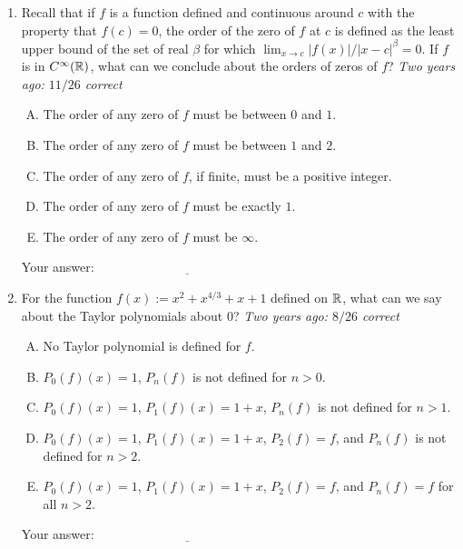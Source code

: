 \documentclass[10pt]{amsart}
\begin{document}
\begin{enumerate}

\item Recall that if $f$ is a function defined and continuous around
  $c$ with the property that $f(c) = 0$, the order of the zero of $f$
  at $c$ is defined as the least upper bound of the set of real $\beta$ for
  which $\lim_{x \to c} |f(x)|/|x - c|^\beta = 0$. If $f$ is in
  $C^{\infty}(\mathbb{R})$, what can we conclude about the orders of zeros of
  $f$? {\em Two years ago: $11/26$ correct}

  \begin{enumerate}[(A)]
  \item The order of any zero of $f$ must be between $0$ and $1$.
  \item The order of any zero of $f$ must be between $1$ and $2$.
  \item The order of any zero of $f$, if finite, must be a positive
  integer.
  \item The order of any zero of $f$ must be exactly $1$.
  \item The order of any zero of $f$ must be $\infty$.
  \end{enumerate}

  \vspace{0.05in}
  Your answer: $\underline{\qquad\qquad\qquad\qquad\qquad\qquad\qquad}$
  \vspace{0.05in}

\item For the function $f(x) := x^2 + x^{4/3} + x + 1$ defined on
  $\mathbb{R}$, what can we say about the Taylor polynomials about $0$? {\em
  Two years ago: $8/26$ correct}

  \begin{enumerate}[(A)]
  \item No Taylor polynomial is defined for $f$.
  \item $P_0(f)(x) = 1$, $P_n(f)$ is not defined for $n > 0$.
  \item $P_0(f)(x) = 1$, $P_1(f)(x) = 1 + x$, $P_n(f)$ is not defined
    for $n > 1$.
  \item $P_0(f)(x) = 1$, $P_1(f)(x) = 1 + x$, $P_2(f) = f$, and
    $P_n(f)$ is not defined for $n > 2$.
  \item $P_0(f)(x) = 1$, $P_1(f)(x) = 1 + x$, $P_2(f) = f$, and
    $P_n(f) = f$ for all $n > 2$.
  \end{enumerate}

  \vspace{0.05in}
  Your answer: $\underline{\qquad\qquad\qquad\qquad\qquad\qquad\qquad}$
  \vspace{0.05in}


\end{enumerate}
\end{document}
